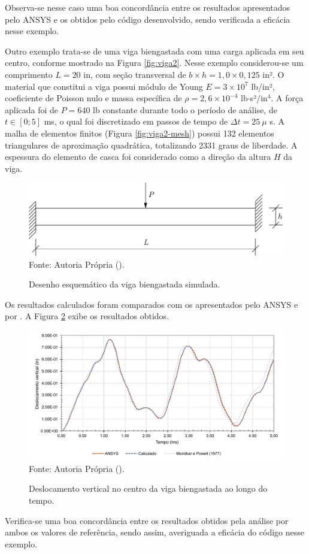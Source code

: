 Observa-se nesse caso uma boa concordância entre os resultados apresentados pelo ANSYS e os obtidos pelo código desenvolvido, sendo verificada a eficácia nesse exemplo.

Outro exemplo trata-se de uma viga biengastada com uma carga aplicada em seu centro, conforme mostrado na Figura \ref{fig:viga2}. Nesse exemplo considerou-se um comprimento $L=20$ in, com seção transversal de $b\times h=1,0\times0,125$ in². O material que constitui a viga possui módulo de Young $E=3\times10^{7}$ lb/in², coeficiente de Poisson nulo e massa específica de $\rho=2,6\times10^{-4}$ lb$\cdot$s²/in$^4$. A força aplicada foi de $P=640$ lb constante durante todo o período de análise, de $t\in[0;5]$ ms, o qual foi discretizado em passos de tempo de $\Delta t=25\ \mu$ s. A malha de elementos finitos (Figura \ref{fig:viga2-mesh}) possui 132 elementos triangulares de aproximação quadrática, totalizando 2331 graus de liberdade. A espessura do elemento de casca foi considerado como a direção da altura $H$ da viga.

\begin{figure}[h!]
    \centering
    \caption{Desenho esquemático da viga biengastada simulada.}
    \includegraphics[width=0.6\linewidth]{Figuras/vigas/viga2.pdf}
    \\Fonte: Autoria Própria (\the\year).
    \label{fig:viga1}
\end{figure}

Os resultados calculados foram comparados com os apresentados pelo ANSYS e por \cite{mondkar1977ansa}. A Figura \ref{fig:res-viga2} exibe os resultados obtidos.

\begin{figure}[h!]
    \centering
    \caption{Deslocamento vertical no centro da viga biengastada ao longo do tempo.}
    \includegraphics[width=\linewidth]{Figuras/vigas/res2.pdf}
    \\Fonte: Autoria Própria (\the\year).
    \label{fig:res-viga2}
\end{figure}

Verifica-se uma boa concordância entre os resultados obtidos pela análise por ambos os valores de referência, sendo assim, averiguada a eficácia do código nesse exemplo.